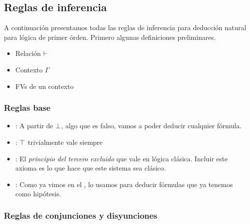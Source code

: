 \subsection{Reglas de inferencia}

\newcommand{\proofSpacing}{\vspace*{0.2cm}}

A continuación presentamos todas las reglas de inferencia para deducción
natural para lógica de primer órden. Primero algunas definiciones preliminares.

\begin{itemize}
    \item Relación $\vdash$
    \item Contexto $\Gamma$
    \item FVs de un contexto
\end{itemize}

\subsubsection{Reglas base}


\begin{multicols}{2}
    \proofTreeFalseE
    \proofTreeTrueI
\end{multicols}

\begin{multicols}{2}
    \proofTreeLEM
    \proofTreeAx
\end{multicols}

\begin{itemize}
    \item {}: A partir de $\bot$, algo que es falso, vamos a poder deducir cualquier
    fórmula.
    \item {}: $\top$ trivialmente vale siempre
    \item {}: El \textit{principio del tercero excluido} que vale en
    lógica clásica. Incluir este axioma es lo que hace que este sistema sea
    clásico.
    \item {}: Como ya vimos en el , lo usamos para
    deducir fórmulas que ya tenemos como hipótesis.
\end{itemize}

\subsubsection{Reglas de conjunciones y disyunciones}

\proofTreeAndI


